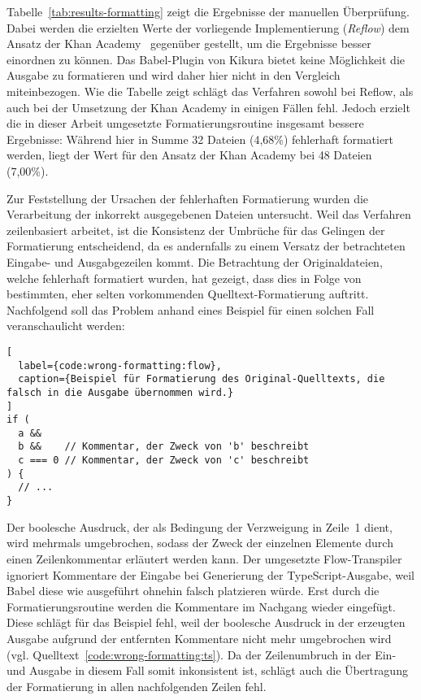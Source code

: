
Tabelle~\ref{tab:results-formatting} zeigt die Ergebnisse der manuellen Überprüfung. Dabei werden die erzielten Werte der vorliegende Implementierung (\textit{Reflow}) dem Ansatz der Khan Academy~\autocite{KHAN:FLOW_TO_TS} gegenüber gestellt, um die Ergebnisse besser einordnen zu können. Das Babel-Plugin von Kikura bietet keine Möglichkeit die Ausgabe zu formatieren und wird daher hier nicht in den Vergleich miteinbezogen.
Wie die Tabelle zeigt schlägt das Verfahren sowohl bei Reflow, als auch bei der Umsetzung der Khan Academy in einigen Fällen fehl. Jedoch erzielt die in dieser Arbeit umgesetzte Formatierungsroutine insgesamt bessere Ergebnisse: Während hier in Summe 32 Dateien (4,68\%) fehlerhaft formatiert werden, liegt der Wert für den Ansatz der Khan Academy bei 48 Dateien (7,00\%).

\medbreak


Zur Feststellung der Ursachen der fehlerhaften Formatierung wurden die Verarbeitung der inkorrekt ausgegebenen Dateien untersucht. Weil das Verfahren zeilenbasiert arbeitet, ist die Konsistenz der Umbrüche für das Gelingen der Formatierung entscheidend, da es andernfalls zu einem Versatz der betrachteten Eingabe- und Ausgabgezeilen kommt. Die Betrachtung der Originaldateien, welche fehlerhaft formatiert wurden, hat gezeigt, dass dies in Folge von bestimmten, eher selten vorkommenden Quelltext-Formatierung auftritt. Nachfolgend soll das Problem anhand eines Beispiel für einen solchen Fall veranschaulicht werden:

\begin{lstlisting}[
  label={code:wrong-formatting:flow},
  caption={Beispiel für Formatierung des Original-Quelltexts, die falsch in die Ausgabe übernommen wird.}
]
if (
  a &&
  b &&    // Kommentar, der Zweck von 'b' beschreibt
  c === 0 // Kommentar, der Zweck von 'c' beschreibt
) {
  // ...
}
\end{lstlisting}

Der boolesche Ausdruck, der als Bedingung der Verzweigung in Zeile~1 dient, wird mehrmals umgebrochen, sodass der Zweck der einzelnen Elemente durch einen Zeilenkommentar erläutert werden kann. Der umgesetzte Flow-Transpiler ignoriert Kommentare der Eingabe bei Generierung der TypeScript-Ausgabe, weil Babel diese wie ausgeführt ohnehin falsch platzieren würde. Erst durch die Formatierungsroutine werden die Kommentare im Nachgang wieder eingefügt. Diese schlägt für das Beispiel fehl, weil der boolesche Ausdruck in der erzeugten Ausgabe aufgrund der entfernten Kommentare nicht mehr umgebrochen wird (vgl. Quelltext~\ref{code:wrong-formatting:ts}). Da der Zeilenumbruch in der Ein- und Ausgabe in diesem Fall somit inkonsistent ist, schlägt auch die Übertragung der Formatierung in allen nachfolgenden Zeilen fehl.

